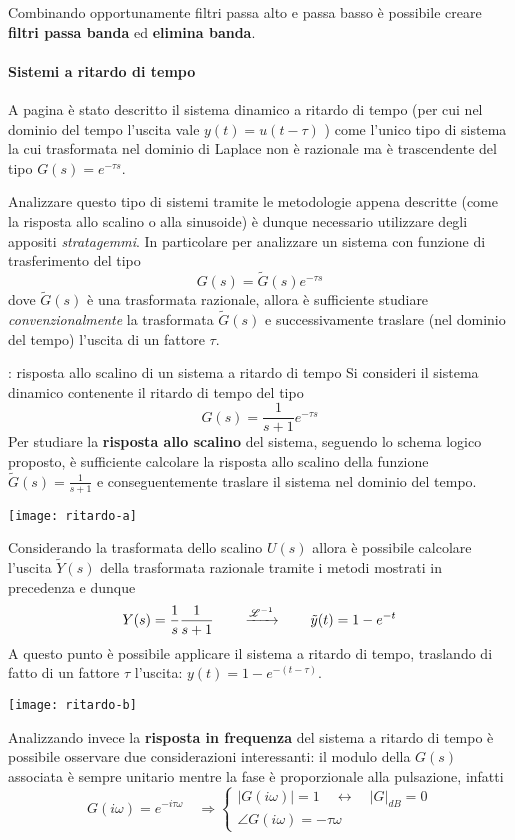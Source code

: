 		Combinando opportunamente filtri passa alto e passa basso è possibile creare \textbf{filtri passa banda} ed \textbf{elimina banda}.
		
		
		\paragraph{Sistemi a ritardo di tempo} A pagina \pageref{sec:ritardotempo} è stato descritto il sistema dinamico a ritardo di tempo (per cui nel dominio del tempo l'uscita vale $y(t) = u(t-\tau)$ ) come l'unico tipo di sistema la cui trasformata nel dominio di Laplace non è razionale ma è trascendente del tipo $G(s) = e^{-\tau s}$.
		
		Analizzare questo tipo di sistemi tramite le metodologie appena descritte (come la risposta allo scalino o alla sinusoide) è dunque necessario utilizzare degli appositi \textit{stratagemmi}. In particolare per analizzare un sistema con funzione di trasferimento del tipo
		\[ G(s) = \tilde G(s) e^{-\tau s} \]
		dove $\tilde G(s)$ è una trasformata razionale, allora è sufficiente studiare \textit{convenzionalmente} la trasformata $\tilde G(s)$ e successivamente traslare (nel dominio del tempo) l'uscita di un fattore $\tau$.
		
		\begin{esempio}{: risposta allo scalino di un sistema a ritardo di tempo}
			Si consideri il sistema dinamico contenente il ritardo di tempo del tipo
			\[ G(s) = \frac 1 {s+1} e^{-\tau s}  \]
			Per studiare la \textbf{risposta allo scalino} del sistema, seguendo lo schema logico proposto, è sufficiente calcolare la risposta allo scalino della funzione $\tilde G(s) = \frac 1 {s+1}$ e conseguentemente traslare il sistema nel dominio del tempo.
			\begin{center}
				\texttt{[image: ritardo-a]}
			\end{center}
			Considerando la trasformata dello scalino $U(s)$ allora è possibile calcolare l'uscita $\tilde Y(s)$ della trasformata razionale tramite i metodi mostrati in precedenza e dunque
			\[  Y(s) = \frac 1 s \frac 1 {s+1} \qquad \xrightarrow{\mathscr {L}^{-1}} \qquad \tilde y(t) = 1 - e^{-t} \] 
			A questo punto è possibile applicare il sistema a ritardo di tempo, traslando di fatto di un fattore $\tau$ l'uscita: $y(t) = 1 - e^{-(t-\tau)}$.
			\begin{center}
				\texttt{[image: ritardo-b]}
			\end{center}
		\end{esempio}
		
		Analizzando invece la \textbf{risposta in frequenza} del sistema a ritardo di tempo è possibile osservare due considerazioni interessanti: il modulo della $G(s)$ associata è sempre unitario mentre la fase è proporzionale alla pulsazione, infatti
		\[ G(i\omega) = e^{-i\tau \omega} \quad \Rightarrow \begin{cases}
			|G(i\omega)| = 1 \quad \leftrightarrow \quad |G|_{dB} = 0 \\
			\angle G(i\omega) = -\tau \omega
		\end{cases} \] 
	
	
	
	
	
	
	
	
	
	